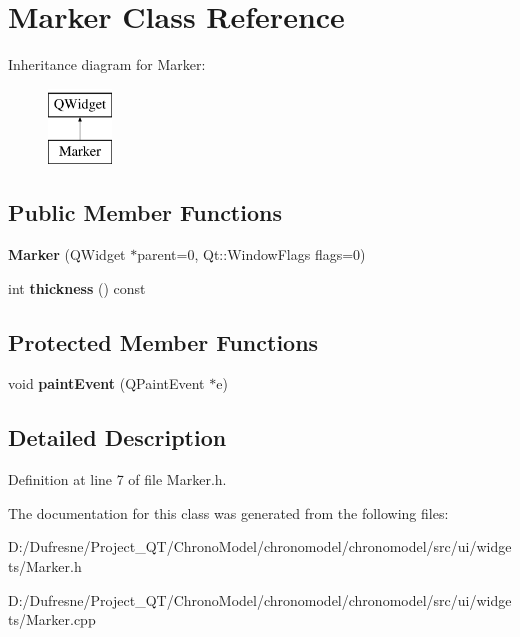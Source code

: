 \hypertarget{class_marker}{\section{Marker Class Reference}
\label{class_marker}
}
Inheritance diagram for Marker\-:\begin{figure}[H]
\begin{center}
\leavevmode
\includegraphics[height=2.000000cm]{class_marker}
\end{center}
\end{figure}
\subsection*{Public Member Functions}
\begin{DoxyCompactItemize}
\item 
\hypertarget{class_marker_a266da85acd30d3cd7045b739514db20c}{{\bfseries Marker} (Q\-Widget $\ast$parent=0, Qt\-::\-Window\-Flags flags=0)}\label{class_marker_a266da85acd30d3cd7045b739514db20c}

\item 
\hypertarget{class_marker_a48dbac3163d2dbaa1d9492dc1f05d0cf}{int {\bfseries thickness} () const }\label{class_marker_a48dbac3163d2dbaa1d9492dc1f05d0cf}

\end{DoxyCompactItemize}
\subsection*{Protected Member Functions}
\begin{DoxyCompactItemize}
\item 
\hypertarget{class_marker_a322c5d4c32a661197ea569224859cce9}{void {\bfseries paint\-Event} (Q\-Paint\-Event $\ast$e)}\label{class_marker_a322c5d4c32a661197ea569224859cce9}

\end{DoxyCompactItemize}


\subsection{Detailed Description}


Definition at line 7 of file Marker.\-h.



The documentation for this class was generated from the following files\-:\begin{DoxyCompactItemize}
\item 
D\-:/\-Dufresne/\-Project\-\_\-\-Q\-T/\-Chrono\-Model/chronomodel/chronomodel/src/ui/widgets/Marker.\-h\item 
D\-:/\-Dufresne/\-Project\-\_\-\-Q\-T/\-Chrono\-Model/chronomodel/chronomodel/src/ui/widgets/Marker.\-cpp\end{DoxyCompactItemize}
